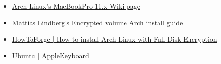 \begin{itemize}
	\item \href{https://wiki.archlinux.org/index.php/MacBookPro11,x#Using_the_MacBook.27s_native_EFI_bootloader_.28recommended.29}{Arch Linux's MacBookPro 11.x Wiki page}
	\item \href{https://gist.github.com/mattiaslundberg/8620837}{Mattias Lindberg's Encrypted volume Arch install guide}
	\item \href{https://www.howtoforge.com/tutorial/how-to-install-arch-linux-with-full-disk-encryption/}{HowToForge | How to install Arch Linux with Full Disk Encryption}
	\item \href{https://help.ubuntu.com/community/AppleKeyboard#Change_Function_Key_behavior}{Ubuntu | AppleKeyboard}
\end{itemize}


